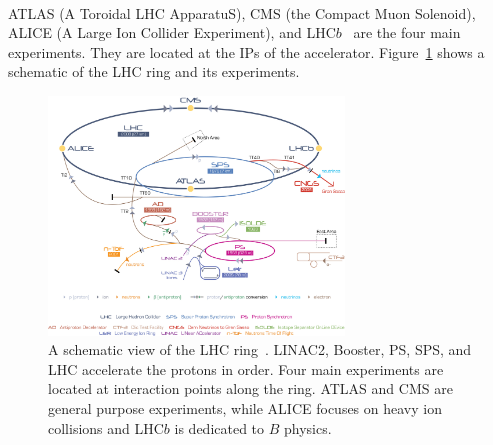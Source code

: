 \paragraph{}
ATLAS (A Toroidal LHC ApparatuS), CMS (the Compact Muon Solenoid), ALICE (A Large Ion Collider Experiment), and LHC$b$~\cite{ATLASPaper, CMSPaper, LHCbPaper, ALICEPaper} are the four main experiments. They are located at the IPs of the accelerator. Figure~\ref{fig:LHC} shows a schematic of the LHC ring and its experiments. 

\begin{figure}[h!]
  \centering
  \captionsetup{justification=centering}
  \includegraphics[width=0.7\textwidth]{figures/detector/Cern-Accelerator-Complex.jpg}
   \caption{A schematic view of the LHC ring~\cite{LHCReview}. LINAC2, Booster, PS, SPS, and LHC accelerate the protons in order. Four main experiments are located at interaction points along the ring. ATLAS and CMS are general purpose experiments, while ALICE focuses on heavy ion collisions and LHC$b$ is dedicated to $B$ physics.}
  \label{fig:LHC}
\end{figure}

